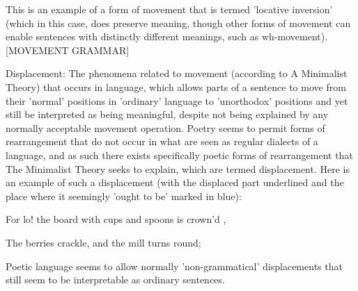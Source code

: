 \documentclass[]{article}
\begin{document}
This is an example of a form of movement that is termed 'locative inversion' (which in this case, does preserve meaning, though other forms of movement can enable sentences with distinctly different meanings, such as wh-movement). [MOVEMENT GRAMMAR]



Displacement: The phenomena related to movement (according to A Minimalist Theory) that occurs in language, which allows parts of a sentence to move from their 'normal' positions in 'ordinary' language to 'unorthodox' positions and yet still be interpreted as being meaningful, despite not being explained by any normally acceptable movement operation. Poetry seems to permit forms of rearrangement that do not occur in what are seen as regular dialects of a language, and as such there exists specifically poetic forms of rearrangement that The Minimalist Theory seeks to explain, which are termed displacement. Here is an example of such a displacement (with the displaced part underlined and the place where it seemingly 'ought to be' marked in blue):



For lo! the board with cups and spoons is crown’d    ,

The berries crackle, and the mill turns round;





Poetic language seems to allow normally 'non-grammatical' displacements that still seem to be interpretable as ordinary sentences.



\section{}
\end{document}
